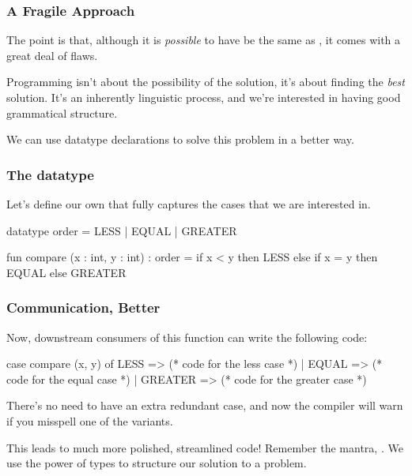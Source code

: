 \documentclass[aspectratio=169]{beamer}
\begin{document}
\begin{frame}[fragile]
  \frametitle{A Fragile Approach}

  The point is that, although it is \textit{possible} to have  be the
  same as , it comes with a great deal of flaws.

  \pause
  \vspace{\fill}

  Programming isn't about the possibility of the solution, it's about finding the
  \textit{best} solution. It's an inherently linguistic process, and we're interested
  in having good grammatical structure.

  \pause
  \vspace{\fill}

  We can use datatype declarations to solve this problem in a better way.
\end{frame}

\begin{frame}[fragile]
  \frametitle{The  datatype}

  Let's define our own  that fully captures the cases that
  we are interested in.

  \pause
  \vspace{\fill}

  \begin{codeblock}
    datatype order = LESS | EQUAL | GREATER

    fun compare (x : int, y : int) : order = 
      if x < y then
        LESS
      else if x = y then
        EQUAL 
      else
        GREATER 
  \end{codeblock}
\end{frame}

\begin{frame}[fragile]
  \frametitle{Communication, Better}

  \tgs

  Now, downstream consumers of this function can write the following code:

  \pause
  \vspace{\fill}

  \begin{codeblock}
    case compare (x, y) of
      LESS => (* code for the less case *)
    | EQUAL => (* code for the equal case *) 
    | GREATER => (* code for the greater case *)
  \end{codeblock}

  \pause
  \vspace{\fill}

  There's no need to have an extra redundant case, and now the compiler will
  warn if you misspell one of the variants.

  \pause
  \vspace{\fill}

  This leads to much more polished, streamlined code! Remember the mantra,
  . We use the power of types to structure our
  solution to a problem.
\end{frame}
\end{document}
